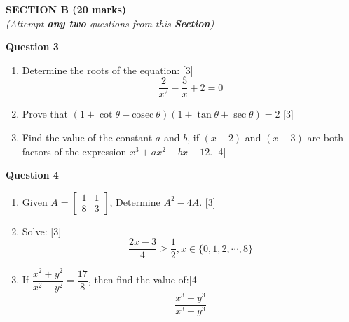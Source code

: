 \begin{center}
   \large
   \textbf{SECTION B (20 marks)}\\
   \vspace{5mm}
   \normalsize
   \textit{(Attempt \textbf{any two} questions from this \textbf{Section})}
\end{center}
\par

\noindent
\textbf{Question 3}
\begin{enumerate}[label=(\roman*)]

    \item Determine the roots of the equation: \hfill [3]
        \[ \frac{2}{x^2} - \frac{5}{x} + 2 = 0 \]

    \item Prove that $(1 + \cot \theta - \mathrm{cosec} \ \theta)(1 + \tan \theta + \sec \theta) = 2$ 
        \hfill [3]

    \item Find the value of the constant $a$ and $b$, if 
        $(x-2)$ and $(x-3)$ are both factors of the expression
        $x^3 + ax^2 + bx - 12$. \hfill [4]

\end{enumerate}

\noindent
\textbf{Question 4}
\begin{enumerate}[label=(\roman*)]

    \item Given $ A = \begin{bmatrix*} 1 & 1 \\ 8 & 3 \end{bmatrix*} $, 
        Determine $A^2 - 4A$. \hfill [3]

    \item Solve: \hfill [3]
        \[
            \frac{2x-3}{4} \geq \frac{1}{2}, x \in \{0,1,2,\cdots,8\}
        \]

    \item If $\dfrac{x^2 + y^2}{x^2 - y^2} = \dfrac{17}{8}$, then
        find the value of:\hfill [4]
        \[ \frac{x^3 + y^3}{x^3 - y^3} \]

\end{enumerate}

